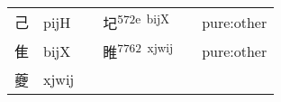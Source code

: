 \documentclass[14pt,a4paper]{scrartcl}
\begin{document}
\begin{longtable}[c]{@{}llllll@{}}
\begin{minipage}[t]{0.14\columnwidth}\raggedright\strut
己
\strut\end{minipage} &
\begin{minipage}[t]{0.14\columnwidth}\raggedright\strut
pijH
\strut\end{minipage} &
\begin{minipage}[t]{0.14\columnwidth}\raggedright\strut
\strut\end{minipage} &
\begin{minipage}[t]{0.14\columnwidth}\raggedright\strut
圮\textsuperscript{572e~bijX}
\strut\end{minipage} &
\begin{minipage}[t]{0.14\columnwidth}\raggedright\strut
\strut\end{minipage} &
\begin{minipage}[t]{0.14\columnwidth}\raggedright\strut
pure:other
\strut\end{minipage}\tabularnewline
\begin{minipage}[t]{0.14\columnwidth}\raggedright\strut
隹
\strut\end{minipage} &
\begin{minipage}[t]{0.14\columnwidth}\raggedright\strut
bijX
\strut\end{minipage} &
\begin{minipage}[t]{0.14\columnwidth}\raggedright\strut
\strut\end{minipage} &
\begin{minipage}[t]{0.14\columnwidth}\raggedright\strut
睢\textsuperscript{7762~xjwij}
\strut\end{minipage} &
\begin{minipage}[t]{0.14\columnwidth}\raggedright\strut
\strut\end{minipage} &
\begin{minipage}[t]{0.14\columnwidth}\raggedright\strut
pure:other
\strut\end{minipage}\tabularnewline
\begin{minipage}[t]{0.14\columnwidth}\raggedright\strut
夔
\strut\end{minipage} &
\begin{minipage}[t]{0.14\columnwidth}\raggedright\strut
xjwij
\strut\end{minipage} &
\begin{minipage}[t]{0.14\columnwidth}\raggedright\strut
\strut\end{minipage} &
\begin{minipage}[t]{0.14\columnwidth}\raggedright\strut

\end{minipage}
\end{longtable}
\end{document}
